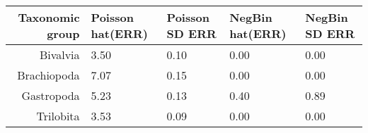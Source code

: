 \begin{table}[ht]
\centering
\begin{tabular}{r|llll}
  \hline
Taxonomic group & Poisson hat(ERR) & Poisson SD ERR & NegBin hat(ERR) & NegBin SD ERR \\ 
  \hline
Bivalvia & 3.50 & 0.10 & 0.00 & 0.00 \\ 
  Brachiopoda & 7.07 & 0.15 & 0.00 & 0.00 \\ 
  Gastropoda & 5.23 & 0.13 & 0.40 & 0.89 \\ 
  Trilobita & 3.53 & 0.09 & 0.00 & 0.00 \\ 
   \hline
\end{tabular}
\label{tab:cv_err}
\end{table}
